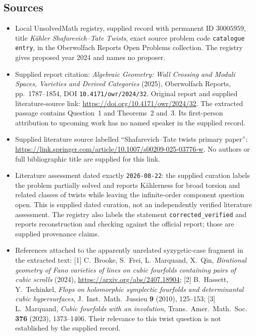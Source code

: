 \documentclass[11pt]{article}
\begin{document}
\subsection{Sources}
\begin{itemize}
\item Local UnsolvedMath registry, supplied record with permanent ID \(30005959\), title \emph{K\"ahler Shafarevich--Tate Twists}, exact source problem code \texttt{catalogue entry}, in the Oberwolfach Reports Open Problems collection. The registry gives proposed year 2024 and names no proposer.
\item Supplied report citation: \emph{Algebraic Geometry: Wall Crossing and Moduli Spaces, Varieties and Derived Categories} (2025), Oberwolfach Reports, pp.~1787--1854, DOI \texttt{10.4171/owr/2024/32}. Original report and supplied literature-source link: \url{https://doi.org/10.4171/owr/2024/32}. The extracted passage contains Question~1 and Theorems~2 and~3. Its first-person attribution to upcoming work has no named speaker in the supplied record.
\item Supplied literature source labelled ``Shafarevich--Tate twists primary paper'': \url{https://link.springer.com/article/10.1007/s00209-025-03776-w}. No authors or full bibliographic title are supplied for this link.
\item Literature assessment dated exactly \texttt{2026-08-22}: the supplied curation labels the problem partially solved and reports K\"ahlerness for broad torsion and related classes of twists while leaving the infinite-order component question open. This is supplied dated curation, not an independently verified literature assessment. The registry also labels the statement \texttt{corrected\_verified} and reports reconstruction and checking against the official report; those are supplied provenance claims.
\item References attached to the apparently unrelated syzygetic-case fragment in the extracted text: [1] C.~Brooke, S.~Frei, L.~Marquand, X.~Qin, \emph{Birational geometry of Fano varieties of lines on cubic fourfolds containing pairs of cubic scrolls} (2024), \url{https://arxiv.org/abs/2407.18904}; [2] B.~Hassett, Y.~Tschinkel, \emph{Flops on holomorphic symplectic fourfolds and determinantal cubic hypersurfaces}, J.~Inst.~Math.~Jussieu \textbf{9} (2010), 125--153; [3] L.~Marquand, \emph{Cubic fourfolds with an involution}, Trans.~Amer.~Math.~Soc. \textbf{376} (2023), 1373--1406. Their relevance to this twist question is not established by the supplied record.
\end{itemize}
\end{document}
